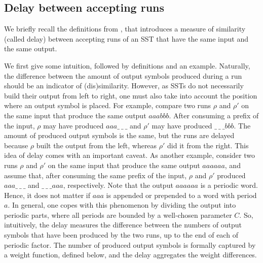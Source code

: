 \documentclass{article}
\begin{document}
\subsection{Delay between accepting runs}\label{subsec:delay}

We briefly recall the definitions from \cite{SSTdelay}, that introduces
a measure of similarity (called delay)
between accepting runs of an SST that have the same input and the same output.

We first give some intuition, followed by definitions and an example.
Naturally, the difference between the amount of output symbols produced during a run should be an indicator of (dis)similarity. 
However, as SSTs do not necessarily build their output 
from left to right, one must also take into account 
the position where an output symbol is placed.
For example, compare two runs $\rho$ and $\rho'$ 
on the same input that produce the same output 
$aaabbb$. %
After consuming a prefix of the input, 
$\rho$ may have produced 
$aaa\_\ \_\ \_$ 
and $\rho'$ may have produced 
$\_\ \_\ \_bbb$. 
The amount of produced output symbols is the same,
but the runs are delayed because $\rho$ 
built the output from the left, 
whereas $\rho'$ did it from the right.
This idea of delay comes with an important caveat.
As another example, consider two runs $\rho$ and $\rho'$ 
on the same input that produce the same output 
$aaaaaa$,
and assume that, after consuming the same prefix of the input,
$\rho$ and $\rho'$ produced 
$aaa\_\ \_\ \_$ and $\_\ \_\ \_aaa$, respectively. 
Note that the output 
$aaaaaa$ is a periodic word. %
Hence, it does not matter if 
$aaa$ is appended or prepended to a word with period $a$. %
In general, one copes with this phenomenon 
by dividing the output into periodic parts,
where all periods are bounded by a well-chosen parameter $C$.
So, intuitively, the delay measures 
the difference between the numbers of output symbols that have 
been produced by the two runs, up to the end of each of periodic factor. The number of produced output symbols is formally captured 
by a weight function, defined below, and the delay aggregates
the weight differences. 
\end{document}
